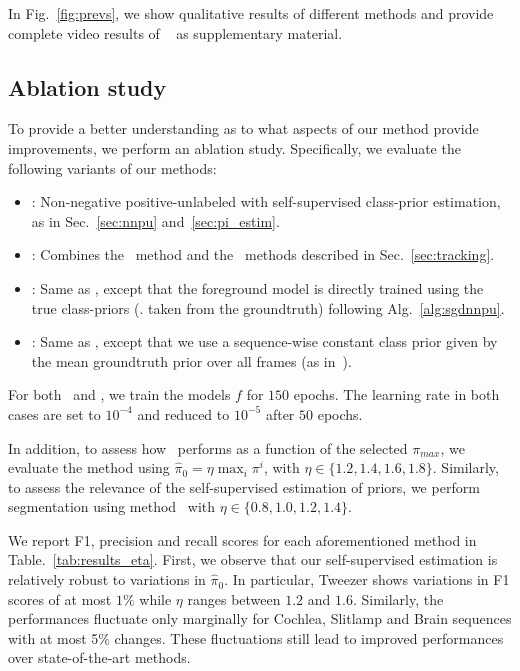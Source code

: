 In Fig.~\ref{fig:prevs}, we show qualitative results of different methods and provide complete video results of \SSnnPUKSP~ as supplementary material.

\subsection{Ablation study}
\label{sec:ablation}
To provide a better understanding as to what aspects of our method provide improvements, we perform an ablation study. Specifically, we evaluate the following variants of our methods:
\begin{itemize}
\item \SSnnPU: Non-negative positive-unlabeled with self-supervised class-prior estimation, as in Sec.~\ref{sec:nnpu} and~\ref{sec:pi_estim}.
\item \SSnnPUKSP: Combines the \SSnnPU~method and the \KSPTrack~methods described in Sec.~\ref{sec:tracking}.
\item \SSnnPUTrue: Same as \SSnnPUKSP, except that the foreground model is directly trained using the true class-priors (\ie. taken from the groundtruth) following Alg.~\ref{alg:sgdnnpu}.
\item \SSnnPUConst: Same as \SSnnPUTrue, except that we use a sequence-wise constant class prior given by the mean groundtruth prior over all frames (as in~\cite{kiryo17}).
\end{itemize}
For both \SSnnPUTrue~and \SSnnPUConst, we train the models $f$ for $150$ epochs. The learning rate in both cases are set to $10^{-4}$ and reduced to $10^{-5}$ after $50$ epochs.



In addition, to assess how \SSnnPUKSP~performs as a function of the selected $\pi_{max}$, we evaluate the method using $\hat \pi_{0}=\eta \max_{i}\pi^{i}$, with $\eta \in \{1.2, 1.4, 1.6, 1.8\}$. Similarly, to assess the relevance of the self-supervised estimation of priors, we perform segmentation using method \SSnnPUConst~with $\eta \in \{0.8, 1.0, 1.2, 1.4\}$.

We report F1, precision and recall scores for each aforementioned method in Table.~\ref{tab:results_eta}. First, we observe that our self-supervised estimation is relatively robust to variations in $\hat \pi_{0}$.
In particular, Tweezer shows variations in F1 scores of at most $1\%$ while $\eta$ ranges between $1.2$ and $1.6$. Similarly, the performances fluctuate only marginally for Cochlea, Slitlamp and Brain sequences with at most 5\% changes. These fluctuations still lead to improved performances over state-of-the-art methods.

